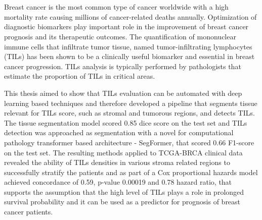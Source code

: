 \chapter{\abstractname}

Breast cancer is the most common type of cancer worldwide with a high mortality
rate causing millions of cancer-related deaths annually.
Optimization of diagnostic biomarkers play important role in the improvement
of breast cancer prognosis and its therapeutic outcomes.
The quantification of mononuclear immune cells that infiltrate tumor tissue,
named tumor-infiltrating lymphocytes (TILs) has been shown to
be a clinically useful biomarker and essential in breast cancer progression.
TILs analysis is typically performed by pathologists that estimate the proportion
of TILs in critical areas.

This thesis aimed to show that TILs evaluation can be automated with deep learning
based techniques and therefore developed a pipeline that segments tissue relevant
for TILs score, such as stromal and tumorous regions, and detects TILs. The tissue
segmentation model scored 0.85 dice score on the test set and TILs
detection was approached as segmentation with a novel for computational pathology
transformer based architecture - SegFormer, that scored 0.66 F1-score on the test set.
The resulting methods applied to TCGA-BRCA clinical data revealed the ability of TILs
densities in various stroma related regions to successfully stratify the patients and
as part of a Cox proportional hazards model achieved concordance of 0.59, p-value 0.00019
and 0.78 hazard ratio, that supports the assumption that the high level of TILs plays a
role in prolonged survival probability and it can be used as a predictor for prognosis
of breast cancer patients.



\makeatletter
{}
{\renewcommand{\abstractname}{Kurzfassung}}
{\renewcommand{\abstractname}{Abstract}}
\makeatother

\chapter{\abstractname}

